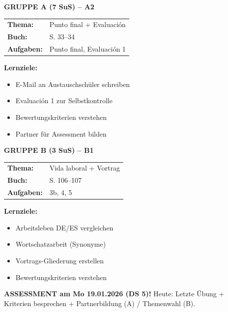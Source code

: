 \documentclass[11pt, a4paper]{article}
\begin{document}
\begin{minipage}[t]{0.48\textwidth}
\textbf{\textcolor{gruppeA}{GRUPPE A (7 SuS) -- A2}}\\[0.2cm]
\begin{tabular}{@{}ll@{}}
\textbf{Thema:} & Punto final + Evaluación \\
\textbf{Buch:} & S. 33--34 \\
\textbf{Aufgaben:} & Punto final, Evaluación 1 \\
\end{tabular}

\vspace{0.2cm}

\textbf{Lernziele:}
\begin{itemize}
\item E-Mail an Austauschschüler schreiben
\item Evaluación 1 zur Selbstkontrolle
\item Bewertungskriterien verstehen
\item Partner für Assessment bilden
\end{itemize}
\end{minipage}
\hfill
\begin{minipage}[t]{0.48\textwidth}
\textbf{\textcolor{gruppeB}{GRUPPE B (3 SuS) -- B1}}\\[0.2cm]
\begin{tabular}{@{}ll@{}}
\textbf{Thema:} & Vida laboral + Vortrag \\
\textbf{Buch:} & S. 106--107 \\
\textbf{Aufgaben:} & 3b, 4, 5 \\
\end{tabular}

\vspace{0.2cm}

\textbf{Lernziele:}
\begin{itemize}
\item Arbeitsleben DE/ES vergleichen
\item Wortschatzarbeit (Synonyme)
\item Vortrags-Gliederung erstellen
\item Bewertungskriterien verstehen
\end{itemize}
\end{minipage}

\vspace{0.2cm}

\begin{tcolorbox}[
    colback=wichtig!15,
    colframe=wichtig,
    boxrule=1pt,
    top=2pt, bottom=2pt, left=4pt, right=4pt
]
\footnotesize
\textbf{ASSESSMENT am Mo 19.01.2026 (DS 5)!} Heute: Letzte Übung + Kriterien besprechen + Partnerbildung (A) / Themenwahl (B).
\end{tcolorbox}
\end{document}
